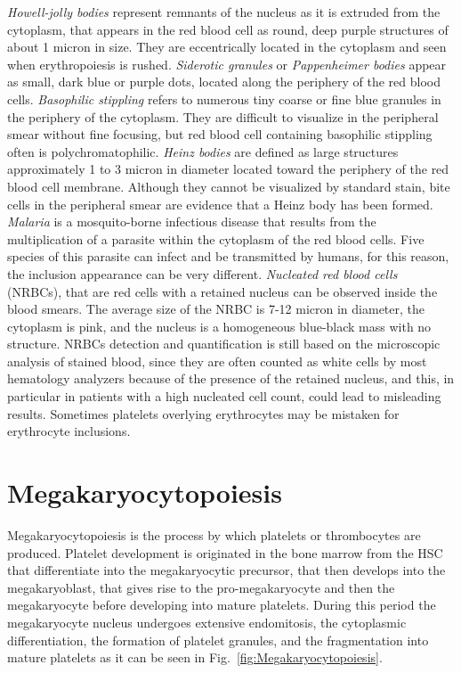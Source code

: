 \documentclass[final,a4paper,12pt,english]{UnicaPhdThesis3}
\begin{document}
{\textit{Howell-jolly bodies} represent remnants of the nucleus as it is extruded from the cytoplasm, that appears in the red blood cell as round, deep purple structures of about 1 micron in size. They are eccentrically located in the cytoplasm and seen when erythropoiesis is rushed. \textit{Siderotic granules} or \textit{Pappenheimer bodies} appear as small, dark blue or purple dots, located along the periphery of the red blood cells. \textit{Basophilic stippling} refers to numerous tiny coarse or fine blue granules in the periphery of the cytoplasm. They are difficult to visualize in the peripheral smear without fine focusing, but red blood cell containing basophilic stippling often is polychromatophilic. \textit{Heinz bodies} are defined as large structures approximately 1 to 3 micron in diameter located toward the periphery of the red blood cell membrane. Although they cannot be visualized by standard stain, bite cells in the peripheral smear are evidence that a Heinz body has been formed. \textit{Malaria} is a mosquito-borne infectious disease that results from the multiplication of a parasite within the cytoplasm of the red blood cells. Five species of this parasite can infect and be transmitted by humans, for this reason, the inclusion appearance can be very different. \textit{Nucleated red blood cells} (NRBCs), that are red cells with a retained nucleus can be observed inside the blood smears. The average size of the NRBC is 7-12 micron in diameter, the cytoplasm is pink, and the nucleus is a homogeneous blue-black mass with no structure. NRBCs detection and quantification is still based on the microscopic analysis of stained blood, since they are often counted as white cells by most hematology analyzers because of the presence of the retained nucleus, and this, in particular in patients with a high nucleated cell count, could lead to misleading results. Sometimes platelets overlying erythrocytes may be mistaken for erythrocyte inclusions. 

\section{Megakaryocytopoiesis}
Megakaryocytopoiesis is the process by which platelets or thrombocytes are produced. Platelet development is originated in the bone marrow from the HSC that differentiate into the megakaryocytic precursor, that then develops into the megakaryoblast, that gives rise to the pro-megakaryocyte and then the megakaryocyte before developing into mature platelets. During this period the megakaryocyte nucleus undergoes extensive endomitosis, the cytoplasmic differentiation, the formation of platelet granules, and the fragmentation into mature platelets as it can be seen in Fig.~\ref{fig:Megakaryocytopoiesis}.

}
\end{document}
